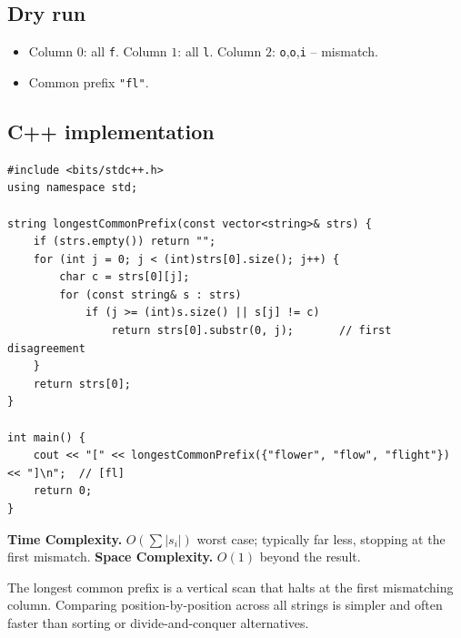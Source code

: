 \subsection*{Dry run}


\begin{itemize}
  \item Column $0$: all \texttt{f}. Column $1$: all \texttt{l}. Column $2$:
        \texttt{o},\texttt{o},\texttt{i} -- mismatch.
  \item Common prefix \texttt{"fl"}.
\end{itemize}

\subsection*{C++ implementation}

\begin{lstlisting}
#include <bits/stdc++.h>
using namespace std;

string longestCommonPrefix(const vector<string>& strs) {
    if (strs.empty()) return "";
    for (int j = 0; j < (int)strs[0].size(); j++) {
        char c = strs[0][j];
        for (const string& s : strs)
            if (j >= (int)s.size() || s[j] != c)
                return strs[0].substr(0, j);       // first disagreement
    }
    return strs[0];
}

int main() {
    cout << "[" << longestCommonPrefix({"flower", "flow", "flight"}) << "]\n";  // [fl]
    return 0;
}
\end{lstlisting}

\begin{complexitybox}
\textbf{Time Complexity.} $O(\sum|s_i|)$ worst case; typically far less,
stopping at the first mismatch. \textbf{Space Complexity.} $O(1)$ beyond the
result.
\end{complexitybox}

\begin{takeawaybox}
The longest common prefix is a vertical scan that halts at the first
mismatching column. Comparing position-by-position across all strings is
simpler and often faster than sorting or divide-and-conquer alternatives.
\end{takeawaybox}
